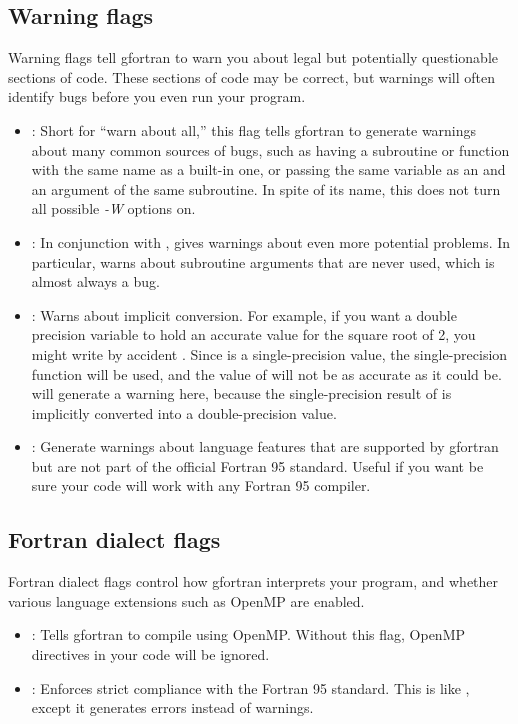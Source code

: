 \documentclass[letterpaper,10pt,english]{sphinxmanual}
\begin{document}
\subsection{Warning flags}
\label{gfortran_flags:warning-flags}
Warning flags tell gfortran to warn you about legal but potentially
questionable sections of code.  These sections of code may be correct,
but warnings will often identify bugs before you even run your
program.
\begin{itemize}
\item {} 
: Short for ``warn about all,'' this flag tells gfortran to
generate warnings about many common sources of bugs, such as having
a subroutine or function with the same name as a built-in one, or
passing the same variable as an  and an
 argument of the same subroutine.
In spite of its name, this does not turn all possible \emph{-W} options on.

\item {} 
: In conjunction with , gives warnings about
even more potential problems.  In particular,  warns
about subroutine arguments that are never used, which is almost
always a bug.

\item {} 
: Warns about implicit conversion. For example, if
you want a double precision variable  to hold an accurate
value for the square root of 2, you might write by accident .  Since  is a single-precision value, the
single-precision  function will be used, and the value of
 will not be as accurate as it could be.  
will generate a warning here, because the single-precision result
of  is implicitly converted into a double-precision value.

\item {} 
: Generate warnings about language features that are
supported by gfortran but are not part of the official Fortran 95
standard.  Useful if you want be sure your code will work with any
Fortran 95 compiler.

\end{itemize}


\subsection{Fortran dialect flags}
\label{gfortran_flags:fortran-dialect-flags}
Fortran dialect flags control how gfortran interprets your program,
and whether various language extensions such as OpenMP are enabled.
\begin{itemize}
\item {} 
: Tells gfortran to compile using OpenMP.  Without this
flag, OpenMP directives in your code will be ignored.

\item {} 
: Enforces strict compliance with the Fortran 95
standard.  This is like , except it generates errors
instead of warnings.

\end{itemize}
\end{document}
